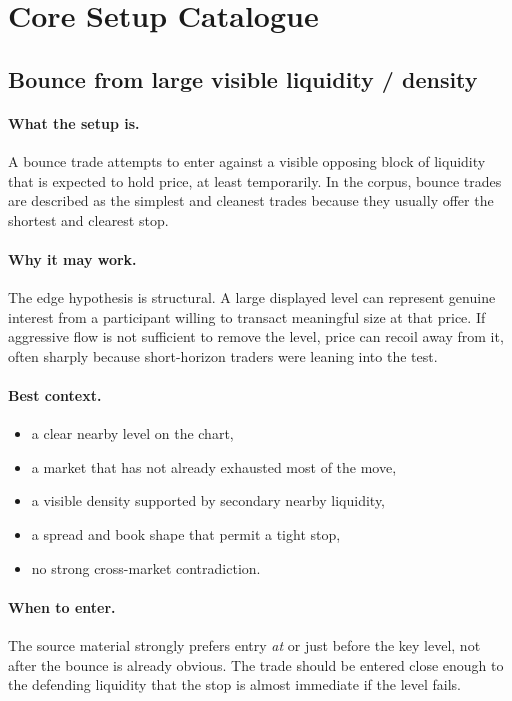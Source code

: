 \section{Core Setup Catalogue}

\subsection{Bounce from large visible liquidity / density}

\paragraph{What the setup is.} A bounce trade attempts to enter against a visible opposing block of liquidity that is expected to hold price, at least temporarily. In the corpus, bounce trades are described as the simplest and cleanest trades because they usually offer the shortest and clearest stop.

\paragraph{Why it may work.} The edge hypothesis is structural. A large displayed level can represent genuine interest from a participant willing to transact meaningful size at that price. If aggressive flow is not sufficient to remove the level, price can recoil away from it, often sharply because short-horizon traders were leaning into the test.

\paragraph{Best context.}
\begin{itemize}
\item a clear nearby level on the chart,
\item a market that has not already exhausted most of the move,
\item a visible density supported by secondary nearby liquidity,
\item a spread and book shape that permit a tight stop,
\item no strong cross-market contradiction.
\end{itemize}

\paragraph{When to enter.} The source material strongly prefers entry \emph{at} or just before the key level, not after the bounce is already obvious. The trade should be entered close enough to the defending liquidity that the stop is almost immediate if the level fails.

